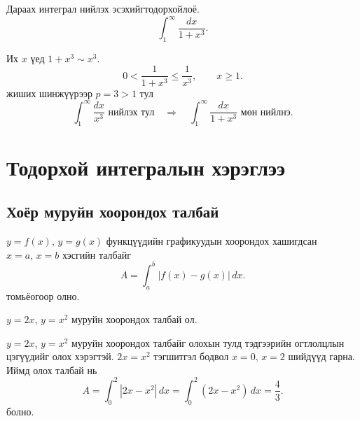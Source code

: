 \begin{example}
Дараах интеграл нийлэх эсэхийгтодорхойлоё.
\[
\int_{1}^{\infty} \frac{dx}{1+x^{3}}.
\]

Их $x$ үед $1+x^3\sim x^{3}$.
\[
0 < \frac{1}{1+x^{3}} \le \frac{1}{x^{3}}, \qquad x\ge1.
\]
жиших шинжүүрээр $p=3>1$ тул  
\[
\int_{1}^{\infty}\frac{dx}{x^{3}}
\text{ нийлэх тул}
\quad\Rightarrow\quad
\int_{1}^{\infty}\frac{dx}{1+x^{3}}
\text{ мөн нийлнэ.}
\]
\end{example}
\section{Тодорхой интегралын хэрэглээ}
\subsection{Хоёр муруйн хоорондох талбай}
$y=f(x) , \, y=g(x)$ функцүүдийн графикуудын хоорондох хашигдсан $x=a , \, x=b$ хэсгийн талбайг
\[
A=\int_{a}^{b} |f(x)-g(x)|\,dx.
\]
томьёогоор олно.
\begin{example} $y=2x$, $y=x^2$ муруйн хоорондох талбай ол.\\
\begin{minipage}{0.6\textwidth}
\end{minipage}
\begin{minipage}{0.4\textwidth}
   $y=2x$, $y=x^2$ муруйн хоорондох талбайг олохын тулд тэдгээрийн огтлолцлын цэгүүдийг олох хэрэгтэй. $2x=x^2$ тэгшитгэл бодвол $x=0,\, x=2$ шийдүүд гарна. Иймд олох талбай нь 
\[
A=\int_{0}^{2} |2x-x^2|\,dx=\int_{0}^{2} (2x-x^2)\,dx=\frac{4}{3}.
\] болно. 
\end{minipage}
\end{example}
